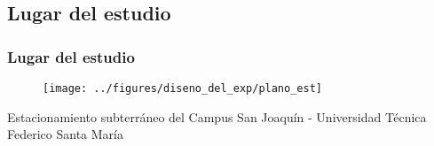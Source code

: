 \documentclass[mathserif]{beamer}
\begin{document}
\subsection{Lugar del estudio}

\begin{frame}
\frametitle{Lugar del estudio}

\begin{figure}
\texttt{[image: ../figures/diseno\_del\_exp/plano\_est]}
\end{figure}

Estacionamiento subterráneo del Campus San Joaquín - Universidad Técnica Federico Santa María

\end{frame}

\begin{comment}
\subsection{Diseño de la Aplicación}

\begin{frame}
\frametitle{Diseño de la Aplicación}

\begin{itemize}

\item Aplicación móvil en Android

\item Requerimientos:
\begin{enumerate}[1]
\item Mostrar el plano de la ubicación
\item Permitir al usuario colocar marcadores de dispositivos Beacon/Access Point
\item Calcular la posición del usuario
\item Permitir al usuario agregar un marcador de la ubicación real
\item Calcular la distancia entre ubicación real y la calculada
\item Registrar las distancias en un archivo persistente
\end{enumerate}

\end{itemize}

\end{frame}
\end{comment}

\end{document}
